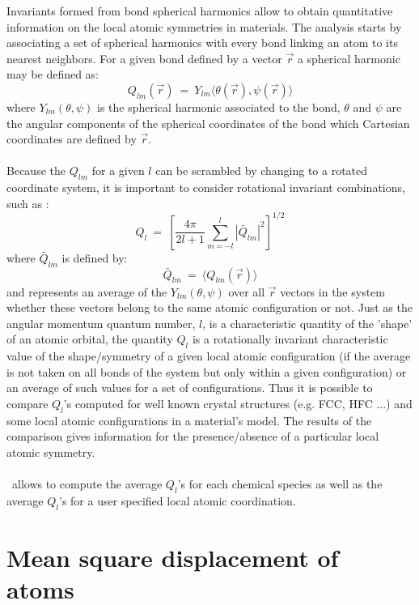 Invariants formed from bond spherical harmonics allow to obtain quantitative information on the local atomic symmetries in materials.
The analysis starts by associating a set of spherical harmonics with every bond linking an atom to its nearest neighbors.
For a given bond defined by a vector $\vec{r}$ a spherical harmonic may be defined as:
\begin{equation}
Q_{lm}(\vec{r})\  =\   Y_{lm} \langle \theta (\vec{r}), \psi (\vec{r}) \rangle
\end{equation}
where $Y_{lm}(\theta, \psi)$ is the spherical harmonic associated to the bond, $\theta$ and $\psi$ are the angular components of the spherical coordinates of the bond which Cartesian coordinates are defined by $\vec{r}$. \\
\\
Because the $Q_{lm}$ for a given $l$ can be scrambled by changing to a rotated coordinate system, it is important to consider rotational invariant combinations, such as \cite{PhysRevB.28.784, ChemSocFar.83-1335}:
\begin{equation}
Q_l\ =\ \left[\frac{4\pi}{2l+1} \sum_{m=-l}^{l} \left| \bar{Q}_{lm} \right|^2 \right]^{1/2}
\end{equation}
where $\bar{Q}_{lm}$ is defined by:
\begin{equation}
\bar{Q}_{lm}\ =\ \langle Q_{lm}( \vec{r} ) \rangle
\end{equation}
and represents an average of the $Y_{lm}(\theta, \psi)$ over all $\vec{r}$ vectors in the system whether these vectors belong to the same atomic configuration or not.
Just as the angular momentum quantum number, $l$, is a characteristic quantity of the 'shape' of an atomic orbital, the quantity $Q_l$ is a rotationally invariant characteristic value of the shape/symmetry of a given local atomic configuration (if the average is not taken on all bonds of the system but only within a given configuration) or an average of such values for a set of configurations.
Thus it is possible to compare $Q_l$'s computed for well known crystal structures (e.g. FCC, HFC ...) and some local atomic configurations in a material's model. The results of the comparison gives information for the presence/absence of a particular local atomic symmetry. \\
\\
\atomes\ allows to compute the average $Q_l$'s for each chemical species as well as the average $Q_l$'s for a user specified local atomic coordination.

\section{Mean square displacement of atoms}

